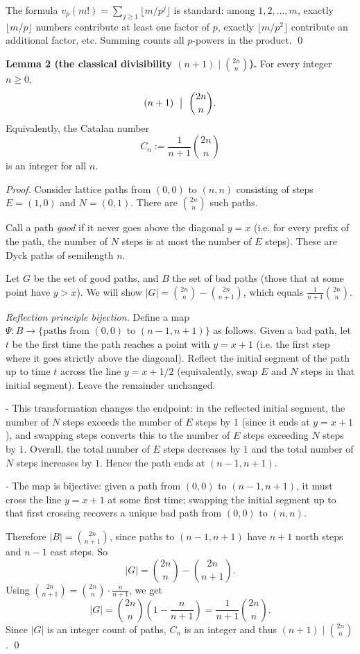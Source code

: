 The formula $v_p(m!)=\sum_{j\ge 1}\lfloor m/p^j\rfloor$ is standard: among $1,2,\dots,m$, exactly $\lfloor m/p\rfloor$ numbers contribute at least one factor of $p$, exactly $\lfloor m/p^2\rfloor$ contribute an additional factor, etc. Summing counts all $p$-powers in the product.
\qed

\medskip

\textbf{Lemma 2 (the classical divisibility $(n+1)\mid \binom{2n}{n}$).}
For every integer $n\ge 0$,
\[
(n+1)\ \bigm|\ \binom{2n}{n}.
\]
Equivalently, the Catalan number
\[
C_n:=\frac{1}{n+1}\binom{2n}{n}
\]
is an integer for all $n$.

\emph{Proof.}
Consider lattice paths from $(0,0)$ to $(n,n)$ consisting of steps $E=(1,0)$ and $N=(0,1)$. There are $\binom{2n}{n}$ such paths.

Call a path \emph{good} if it never goes above the diagonal $y=x$ (i.e. for every prefix of the path, the number of $N$ steps is at most the number of $E$ steps). These are Dyck paths of semilength $n$.

Let $G$ be the set of good paths, and $B$ the set of bad paths (those that at some point have $y>x$).
We will show $|G| = \binom{2n}{n} - \binom{2n}{n+1}$, which equals $\frac{1}{n+1}\binom{2n}{n}$.

\emph{Reflection principle bijection.}
Define a map $\Psi: B \to \{\text{paths from }(0,0)\text{ to }(n-1,n+1)\}$ as follows.
Given a bad path, let $t$ be the first time the path reaches a point with $y=x+1$ (i.e. the first step where it goes strictly above the diagonal). Reflect the initial segment of the path up to time $t$ across the line $y=x+1/2$ (equivalently, swap $E$ and $N$ steps in that initial segment). Leave the remainder unchanged.

- This transformation changes the endpoint: in the reflected initial segment, the number of $N$ steps exceeds the number of $E$ steps by $1$ (since it ends at $y=x+1$), and swapping steps converts this to the number of $E$ steps exceeding $N$ steps by $1$. Overall, the total number of $E$ steps decreases by $1$ and the total number of $N$ steps increases by $1$. Hence the path ends at $(n-1,n+1)$.

- The map is bijective: given a path from $(0,0)$ to $(n-1,n+1)$, it must cross the line $y=x+1$ at some first time; swapping the initial segment up to that first crossing recovers a unique bad path from $(0,0)$ to $(n,n)$.

Therefore $|B|=\binom{2n}{n+1}$, since paths to $(n-1,n+1)$ have $n+1$ north steps and $n-1$ east steps.
So
\[
|G| = \binom{2n}{n} - \binom{2n}{n+1}.
\]
Using $\binom{2n}{n+1} = \binom{2n}{n}\cdot \frac{n}{n+1}$, we get
\[
|G| = \binom{2n}{n}\left(1-\frac{n}{n+1}\right)=\frac{1}{n+1}\binom{2n}{n}.
\]
Since $|G|$ is an integer count of paths, $C_n$ is an integer and thus $(n+1)\mid\binom{2n}{n}$.
\qed

